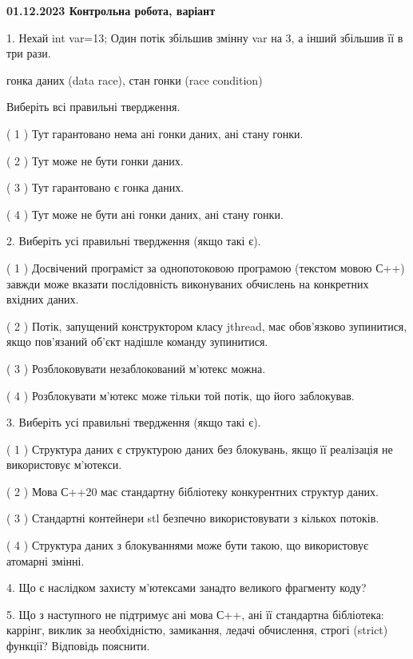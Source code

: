\documentclass[12pt, ukrainian]{article}
\begin{document}
\vspace{4mm}
\newpage
\begin {large}

\textbf{01.12.2023 Контрольна робота, варіант  }\par


{
1. Нехай int var=13; Один потік збільшив змінну var на 3, а інший збільшив її в три рази.

гонка даних (data race), стан гонки (race condition)

Виберіть всі правильні твердження.\par
\vspace{2mm}
( 1 ) Тут гарантовано нема ані гонки даних, ані стану гонки.%

( 2 ) Тут може не бути гонки даних.%

( 3 ) Тут гарантовано є гонка даних.%

( 4 ) Тут може не бути ані гонки даних, ані стану гонки.%


\vspace{5mm}
2. Виберіть усі правильні твердження (якщо такі є).\par
\vspace{2mm}

( 1 ) Досвічений програміст за однопотоковою програмою (текстом мовою С++) завжди може вказати послідовність виконуваних обчислень на конкретних вхідних даних.%

( 2 ) Потік, запущений конструктором класу jthread, має обов’язково зупинитися, якщо пов’язаний об’єкт надішле команду зупинитися.%

( 3 ) Розблоковувати незаблокований м’ютекс можна.%

( 4 ) Розблокувати м’ютекс може тільки той потік, що його заблокував.%


\vspace{5mm}
3. Виберіть усі правильні твердження (якщо такі є).\par
\vspace{2mm}

( 1 ) Структура даних є структурою даних без блокувань, якщо її реалізація не використовує м’ютекси.%

( 2 ) Мова С++20 має стандартну бібліотеку конкурентних структур даних.%

( 3 ) Стандартні контейнери stl безпечно використовувати з кількох потоків.%

( 4 ) Структура даних з блокуваннями може бути такою, що використовує атомарні змінні.%


\vspace{5mm}
4. Що є наслідком захисту м’ютексами занадто великого фрагменту коду?



\vspace{5mm}
5. Що з наступного не підтримує ані мова С++, ані її стандартна бібліотека: каррінг, виклик за необхідністю, замикання, ледачі обчислення, строгі (strict) функції? Відповідь пояснити.
}
\end {large}
\end{document}
